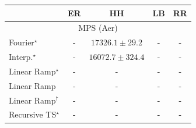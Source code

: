 \begin{tabular}{l|cccc|}
\toprule
            & ER & HH & LB & RR \\
\midrule
\multicolumn{5}{c}{\rule{0pt}{8pt}MPS (Aer)} \\
\midrule
Fourier$^\star$ & {\cellcolor[HTML]{000000}} \color[HTML]{F1F1F1} {\cellcolor{white}} \color{black} - & {\cellcolor[HTML]{4D004B}} \color[HTML]{F1F1F1} $17326.1\pm 29.2$ & {\cellcolor[HTML]{000000}} \color[HTML]{F1F1F1} {\cellcolor{white}} \color{black} - & {\cellcolor[HTML]{000000}} \color[HTML]{F1F1F1} {\cellcolor{white}} \color{black} - \\
Interp.$^\star$ & {\cellcolor[HTML]{000000}} \color[HTML]{F1F1F1} {\cellcolor{white}} \color{black} - & {\cellcolor[HTML]{CFDFED}} \color[HTML]{000000} $16072.7\pm 324.4$ & {\cellcolor[HTML]{000000}} \color[HTML]{F1F1F1} {\cellcolor{white}} \color{black} - & {\cellcolor[HTML]{000000}} \color[HTML]{F1F1F1} {\cellcolor{white}} \color{black} - \\
Linear Ramp$^\star$ & {\cellcolor[HTML]{000000}} \color[HTML]{F1F1F1} {\cellcolor{white}} \color{black} - & {\cellcolor[HTML]{000000}} \color[HTML]{F1F1F1} {\cellcolor{white}} \color{black} - & {\cellcolor[HTML]{000000}} \color[HTML]{F1F1F1} {\cellcolor{white}} \color{black} - & {\cellcolor[HTML]{000000}} \color[HTML]{F1F1F1} {\cellcolor{white}} \color{black} - \\
Linear Ramp & {\cellcolor[HTML]{000000}} \color[HTML]{F1F1F1} {\cellcolor{white}} \color{black} - & {\cellcolor[HTML]{000000}} \color[HTML]{F1F1F1} {\cellcolor{white}} \color{black} - & {\cellcolor[HTML]{000000}} \color[HTML]{F1F1F1} {\cellcolor{white}} \color{black} - & {\cellcolor[HTML]{000000}} \color[HTML]{F1F1F1} {\cellcolor{white}} \color{black} - \\
Linear Ramp$^\dagger$ & {\cellcolor[HTML]{000000}} \color[HTML]{F1F1F1} {\cellcolor{white}} \color{black} - & {\cellcolor[HTML]{000000}} \color[HTML]{F1F1F1} {\cellcolor{white}} \color{black} - & {\cellcolor[HTML]{000000}} \color[HTML]{F1F1F1} {\cellcolor{white}} \color{black} - & {\cellcolor[HTML]{000000}} \color[HTML]{F1F1F1} {\cellcolor{white}} \color{black} - \\
Recursive TS$^\star$ & {\cellcolor[HTML]{000000}} \color[HTML]{F1F1F1} {\cellcolor{white}} \color{black} - & {\cellcolor[HTML]{000000}} \color[HTML]{F1F1F1} {\cellcolor{white}} \color{black} - & {\cellcolor[HTML]{000000}} \color[HTML]{F1F1F1} {\cellcolor{white}} \color{black} - & {\cellcolor[HTML]{000000}} \color[HTML]{F1F1F1} {\cellcolor{white}} \color{black} - \\

\end{tabular}
